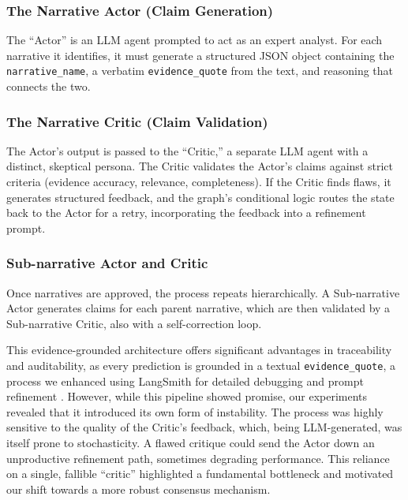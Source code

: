 \subsubsection{The Narrative Actor (Claim Generation)}

The ``Actor'' is an LLM agent prompted to act as an expert analyst. For each narrative it identifies, it must generate a structured JSON object containing the \texttt{narrative\_name}, a verbatim \texttt{evidence\_quote} from the text, and reasoning that connects the two.

\subsubsection{The Narrative Critic (Claim Validation)}

The Actor's output is passed to the ``Critic,'' a separate LLM agent with a distinct, skeptical persona. The Critic validates the Actor's claims against strict criteria (evidence accuracy, relevance, completeness). If the Critic finds flaws, it generates structured feedback, and the graph's conditional logic routes the state back to the Actor for a retry, incorporating the feedback into a refinement prompt.

\subsubsection{Sub-narrative Actor and Critic}

Once narratives are approved, the process repeats hierarchically. A Sub-narrative Actor generates claims for each parent narrative, which are then validated by a Sub-narrative Critic, also with a self-correction loop.

This evidence-grounded architecture offers significant advantages in traceability and auditability, as every prediction is grounded in a textual \texttt{evidence\_quote}, a process we enhanced using LangSmith for detailed debugging and prompt refinement \citep{langsmith2024}. However, while this pipeline showed promise, our experiments revealed that it introduced its own form of instability. The process was highly sensitive to the quality of the Critic's feedback, which, being LLM-generated, was itself prone to stochasticity. A flawed critique could send the Actor down an unproductive refinement path, sometimes degrading performance. This reliance on a single, fallible ``critic'' highlighted a fundamental bottleneck and motivated our shift towards a more robust consensus mechanism.

